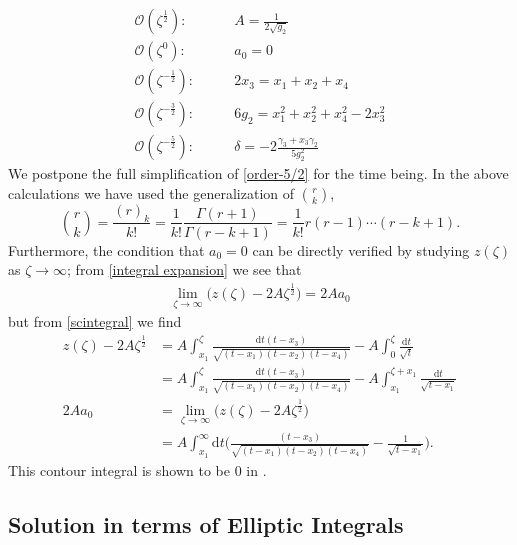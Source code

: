 \documentclass[10pt]{article}
\newcommand{\mcal}[1]{\mathcal{#1}}
\newcommand{\dif}{\mathrm{d}}
\theoremstyle{plain}
\theoremstyle{definition}
\theoremstyle{plain}
\begin{document}
\begin{align}
	\mcal{O}(\zeta^{\frac{1}{2}}):\qquad&  \boxed{A = \frac{1}{2\sqrt{g_2}}} \nonumber\\
	\mcal{O}(\zeta^{0}):\qquad& \boxed{a_0 = 0} \nonumber\\
	\mcal{O}(\zeta^{-\frac{1}{2}}):\qquad&\boxed{2x_3  = x_1+x_2+x_4} \label{order-1/2} \\
	\mcal{O}(\zeta^{-\frac{3}{2}}):\qquad& \boxed{6g_2 =  x_1^2+x_2^2+x_4^2 - 2x_3^2} \label{order-3/2} \\
	\mcal{O}(\zeta^{-\frac{5}{2}}):\qquad &\boxed{\delta = -2\frac{\gamma_3 + x_3\gamma_2}{5g_2^2}} \label{order-5/2}
\end{align}
We postpone the full simplification of \ref{order-5/2} for the time being. 
In the above calculations we have used the generalization of ${r\choose k}$, 
\[ {r \choose k} = \frac{(r)_k}{k!} = \frac{1}{k!}\frac{\Gamma(r+1)}{\Gamma(r-k+1)} = \frac{1}{k!}r(r-1)\cdots(r-k+1). \]
Furthermore, the condition that $a_0 = 0$ can be directly verified by studying $z(\zeta)$ as $\zeta\to\infty$; from \ref{integral expansion} we see that 
\begin{align*}
	\lim_{\zeta\to\infty} \bigg( z(\zeta) - 2A\zeta^{\frac{1}{2}} \bigg) = 2Aa_0
\end{align*}
but from \ref{scintegral} we find
\begin{align*}
	z(\zeta) - 2A\zeta^{\frac{1}{2}} &= A\int_{x_1}^\zeta \frac{\dif t (t-x_3)}{\sqrt{(t-x_1)(t-x_2)(t-x_4)}} - A\int_0^\zeta \frac{\dif t}{\sqrt{t}} \\
	&= A\int_{x_1}^\zeta \frac{\dif t (t-x_3)}{\sqrt{(t-x_1)(t-x_2)(t-x_4)}} - A\int_{x_1}^{\zeta+x_1} \frac{\dif t}{\sqrt{t-x_1}} \\
	2Aa_0 &= \lim_{\zeta\to\infty}\bigg(z(\zeta) - 2A\zeta^{\frac{1}{2}} \bigg)\\ &= A\int_{x_1}^\infty \dif t \bigg(\frac{(t-x_3)}{\sqrt{(t-x_1)(t-x_2)(t-x_4)}} - \frac{1}{\sqrt{t-x_1}} \bigg).
\end{align*}
This contour integral is shown to be $0$ in \cite{hoppe1989quantum}. 

\subsection{Solution in terms of Elliptic Integrals}
\end{document}
